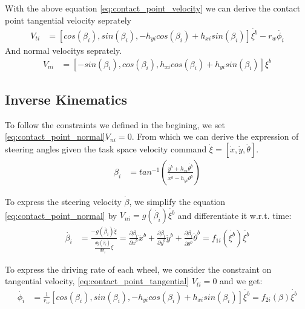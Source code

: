 With the above equation \cref{eq:contact_point_velocity} we can derive the contact point tangential velocity seprately
\begin{equation}\label{eq:contact_point_tangential}
	\begin{split}
	V_{ti} &= [cos(\beta_i), sin(\beta_i), -h_{yi}cos(\beta_i)+h_{xi}sin(\beta_i)]\dot{\xi^b} - r_w\dot{\phi_i}
	\end{split}
\end{equation}
And normal velocitys seprately.
\begin{equation}\label{eq:contact_point_normal}
	\begin{split}
	V_{ni} &= [-sin(\beta_i), cos(\beta_i), h_{xi}cos(\beta_i)+h_{yi}sin(\beta_i)]\xi^b
	\end{split}
\end{equation}

\subsection{Inverse Kinematics}
\label{sec:inverseKinematics}

To follow the constraints we defined in the begining, we set \cref{eq:contact_point_normal}$V_{ni}=0$. From which we can derive the expression of steering angles given the task space velocity command 
$\dot{\xi}=[\dot{x},\dot{y},\dot{\theta}]$.
\begin{equation}\label{eq:beta}
	\begin{split}
	\beta_i &= tan^{-1}(\frac{\dot{y^b}+h_{xi}\dot{\theta^b}}{\dot{x^b}-h_{yi}\dot{\theta^b}})
	\end{split}
\end{equation}

To express the steering velocity $\dot{\beta}$, we simplify the equation \cref{eq:contact_point_normal} by $V_{ni}=g(\dot{\beta_i})\dot{\xi^b}$ and differentiate it w.r.t. time:
\begin{equation}\label{eq:betaDot}
	\begin{split}
	\dot{\beta_i} &= \frac{-g(\dot{\beta_i})\ddot{\xi}}{\frac{dg(\dot{\beta_i})}{d\beta_i}\dot{\xi}}=\frac{\partial\beta_i}{\partial\dot{x}^b}\ddot{x}^b+\frac{\partial\beta_i}{\partial\dot{y}^b}\ddot{y}^b +\frac{\partial\beta_i}{\partial\dot{\theta^b}}\ddot{\theta}^b
	=f_{1i}(\dot{\xi^b})\ddot{\xi^b}
	\end{split}
\end{equation}

To express the driving rate of each wheel, we consider the constraint on tangential velocity, \cref{eq:contact_point_tangential} $V_{ti}=0 $ and we get:
\begin{equation}\label{eq:phi}
	\begin{split}
	\dot{\phi_i} &= \frac{1}{r_w}[cos(\beta_i), sin(\beta_i), -h_{yi}cos(\beta_i)+h_{xi}sin(\beta_i)]\dot{\xi^b}=f_{2i}(\beta)\dot{\xi^b}
	\end{split}
\end{equation}

